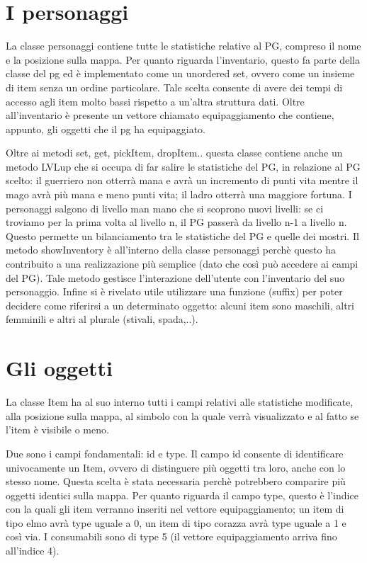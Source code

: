 \documentclass[10pt]{report}
\begin{document}
\section{I personaggi}

La classe personaggi contiene tutte le statistiche relative al PG, compreso il nome e la posizione sulla
mappa. 
Per quanto riguarda l'inventario, questo fa parte della classe del pg ed è implementato come un 
unordered set, ovvero come un insieme di item senza un ordine particolare. Tale scelta consente di avere
dei tempi di accesso agli item molto bassi rispetto a un'altra struttura dati. 
Oltre all'inventario è presente un vettore chiamato equipaggiamento che contiene, appunto,
gli oggetti che il pg ha equipaggiato.

Oltre ai metodi set, get, pickItem, dropItem.. questa classe contiene anche un metodo LVLup che si occupa
di far salire le statistiche del PG, in relazione al PG scelto: il guerriero non otterrà mana e avrà un
incremento di punti vita mentre il mago avrà più mana e meno punti vita; il ladro otterrà una maggiore
fortuna. I personaggi salgono di livello man mano che si scoprono nuovi livelli: se ci troviamo per la prima volta al
livello n, il PG passerà da livello n-1 a livello n. Questo permette un bilanciamento tra
le statistiche del PG e quelle dei mostri.
Il metodo showInventory è all'interno della classe personaggi perchè questo ha contribuito a una 
realizzazione più semplice (dato che così può accedere ai campi del PG). Tale metodo gestisce
l'interazione dell'utente con l'inventario del suo personaggio.
Infine si è rivelato utile utilizzare una funzione (suffix) per poter decidere come riferirsi a un
determinato oggetto: alcuni item sono maschili, altri femminili e altri al plurale (stivali, spada,..).

\section{Gli oggetti}

La classe Item ha al suo interno tutti i campi relativi alle statistiche modificate, alla posizione sulla
mappa, al simbolo con la quale verrà visualizzato e al fatto se l'item è visibile o meno.

Due sono i campi fondamentali: id e type.
Il campo id consente di identificare univocamente un Item, ovvero di distinguere più oggetti tra loro,
anche con lo stesso nome. Questa scelta è stata necessaria perchè potrebbero comparire più 
oggetti identici sulla mappa. Per quanto riguarda il campo type, questo è l'indice con la quali gli item
verranno inseriti nel vettore equipaggiamento; un item di tipo elmo avrà type uguale a
0, un item di tipo corazza avrà type uguale a 1 e così via. I consumabili sono di type 5 (il vettore 
equipaggiamento arriva fino all'indice 4). 
\end{document}
